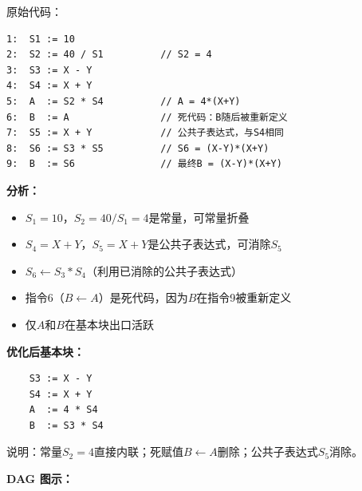 \documentclass[12pt,a4paper,fontset=fandol]{ctexart}
\begin{document}
原始代码：
\begin{verbatim}
1:  S1 := 10
2:  S2 := 40 / S1          // S2 = 4
3:  S3 := X - Y
4:  S4 := X + Y
5:  A  := S2 * S4          // A = 4*(X+Y)
6:  B  := A                // 死代码：B随后被重新定义
7:  S5 := X + Y            // 公共子表达式，与S4相同
8:  S6 := S3 * S5          // S6 = (X-Y)*(X+Y)
9:  B  := S6               // 最终B = (X-Y)*(X+Y)
\end{verbatim}

\textbf{分析：}
\begin{itemize}
    \item $S_1 = 10$，$S_2 = 40/S_1 = 4$是常量，可常量折叠
    \item $S_4 = X+Y$，$S_5 = X+Y$是公共子表达式，可消除$S_5$
    \item $S_6 \gets S_3 * S_4$（利用已消除的公共子表达式）
    \item 指令6（$B \gets A$）是死代码，因为$B$在指令9被重新定义
    \item 仅$A$和$B$在基本块出口活跃
\end{itemize}

\textbf{优化后基本块：}
\begin{verbatim}
    S3 := X - Y
    S4 := X + Y
    A  := 4 * S4
    B  := S3 * S4
\end{verbatim}

说明：常量$S_2 = 4$直接内联；死赋值$B \gets A$删除；公共子表达式$S_5$消除。

\medskip
\textbf{DAG 图示：}
\end{document}
